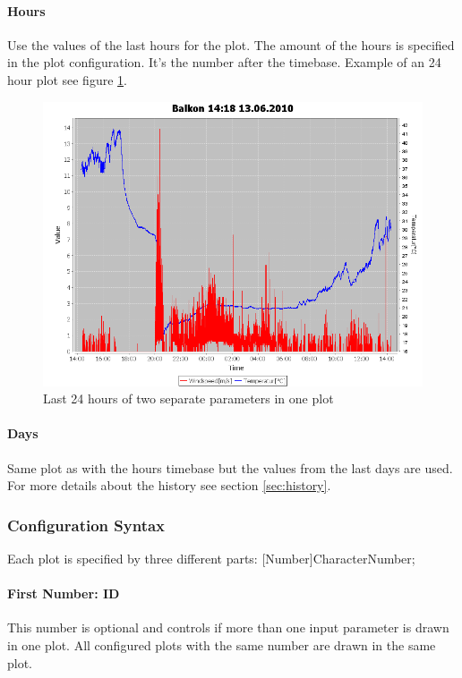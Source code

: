 \paragraph{Hours} %
\label{par:hours}
Use the values of the last hours for the plot. The amount of the hours is specified in the plot configuration. It's the number after the timebase. Example of an 24 hour plot see figure \ref{fig:hours}.
\begin{figure}[ht]
    \centering
    \includegraphics[width=0.9\linewidth]{master/plot_exampleh.png}
    \caption{Last 24 hours of two separate parameters in one plot}
    \label{fig:hours}
\end{figure}

\paragraph{Days} %
\label{par:days}
Same plot as with the hours timebase but the values from the last days are used. For more details about the history see section \ref{sec:history}.

\subsubsection{Configuration Syntax} %
\label{ssub:configuration_syntax}
Each plot is specified by three different parts: [Number]CharacterNumber;

\paragraph{First Number: ID} %
\label{par:first_number_id}
This number is optional and controls if more than one input parameter is drawn in one plot. All configured plots with the same number are drawn in the same plot.
